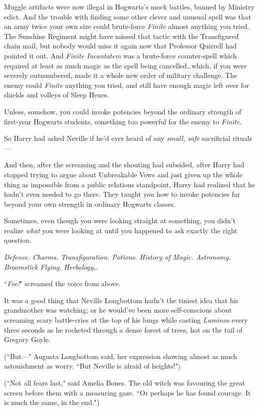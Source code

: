 Muggle artifacts were now illegal in Hogwarts's mock battles, banned by Ministry edict. And the trouble with finding some other clever and unusual spell was that an army twice your own size could brute-force \emph{Finite} almost anything you tried. The Sunshine Regiment might have missed that tactic with the Transfigured chain mail, but nobody would miss it again now that Professor Quirrell had pointed it out. And \emph{Finite Incantatem} was a brute-force counter-spell which required at least as much magic as the spell being cancelled…which, if you were severely outnumbered, made it a whole new order of military challenge. The enemy could \emph{Finite} anything you tried, and still have enough magic left over for shields and volleys of Sleep Hexes.

Unless, somehow, you could invoke potencies beyond the ordinary strength of first-year Hogwarts students, something too powerful for the enemy to \emph{Finite}.

So Harry had asked Neville if he'd ever heard of any \emph{small, safe} sacrificial rituals—

And then, after the screaming and the shouting had subsided, after Harry had stopped trying to argue about Unbreakable Vows and just given up the whole thing as impossible from a public relations standpoint, Harry had realized that he hadn't even needed to go there. They taught you how to invoke potencies far beyond your own strength in ordinary Hogwarts classes.

Sometimes, even though you were looking straight at something, you didn't realize \emph{what} you were looking at until you happened to ask exactly the right question.

\emph{Defence. Charms. Transfiguration. Potions. History of Magic. Astronomy. Broomstick Flying. Herbology…}

``\emph{Foe!}" screamed the voice from above.

\later

It was a good thing that Neville Longbottom hadn't the tiniest idea that his grandmother was watching; or he would've been more self-conscious about screaming scary battle-cries at the top of his lungs while casting \emph{Luminos} every three seconds as he rocketed through a dense forest of trees, hot on the tail of Gregory Goyle.

(``But—" Augusta Longbottom said, her expression showing almost as much astonishment as worry. ``But Neville is afraid of heights!")

(``Not all fears last," said Amelia Bones. The old witch was favouring the great screen before them with a measuring gaze. ``Or perhaps he has found courage. It is much the same, in the end.")

